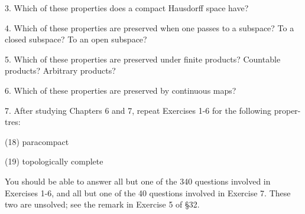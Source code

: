 3. Which of these properties does a compact Hausdorff space have?

4. Which of these properties are preserved when one passes to a subspace? To a closed subspace? To an open subspace?

5. Which of these properties are preserved under finite products? Countable products? Arbitrary products?

6. Which of these properties are preserved by continuous maps?

7. After studying Chapters 6 and 7, repeat Exercises 1-6 for the following proper-tres:

(18) paracompact

(19) topologically complete

You should be able to answer all but one of the 340 questions involved in Exercises 1-6, and all but one of the 40 questions involved in Exercise 7. These two are unsolved; see the remark in Exercise 5 of §32.